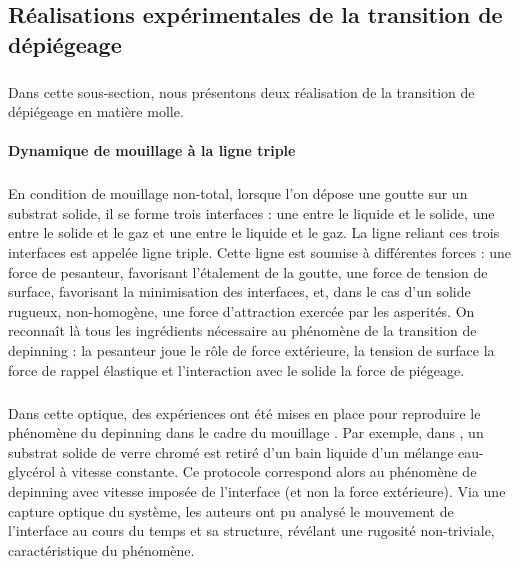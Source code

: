 \subsection{Réalisations expérimentales de la transition de dépiégeage}

\label{sec:exp_depinning}

\subparagraph{}Dans cette sous-section, nous présentons deux réalisation de la transition de dépiégeage en matière molle.

\paragraph{Dynamique de mouillage à la ligne triple}

\subparagraph{}En condition de mouillage non-total, lorsque l'on dépose une goutte sur un substrat solide, il se forme trois interfaces : une entre le liquide et le solide, une entre le solide et le gaz et une entre le liquide et le gaz. La ligne reliant ces trois interfaces est appelée ligne triple. Cette ligne est soumise à différentes forces : une force de pesanteur, favorisant l'étalement de la goutte, une force de tension de surface, favorisant la minimisation des interfaces, et, dans le cas d'un solide rugueux, non-homogène, une force d'attraction exercée par les asperités. On reconnaît là tous les ingrédients nécessaire au phénomène de la transition de depinning \cite{joanny_model_1984, rosso_depiegeage_2002, le_priol_long_range_2020} : la pesanteur joue le rôle de force extérieure, la tension de surface la force de rappel élastique et l'interaction avec le solide la force de piégeage.

\subparagraph{}Dans cette optique, des expériences ont été mises en place pour reproduire le phénomène du depinning dans le cadre du mouillage \cite{moulinet_roughness_2002, le_doussal_height_2009}. Par exemple, dans \cite{moulinet_roughness_2002}, un substrat solide de verre chromé est retiré d'un bain liquide d'un mélange eau-glycérol à vitesse constante. Ce protocole correspond alors au phénomène de depinning avec vitesse imposée de l'interface (et non la force extérieure). Via une capture optique du système, les auteurs ont pu analysé le mouvement de l'interface au cours du temps et sa structure, révélant une rugosité non-triviale, caractéristique du phénomène.

